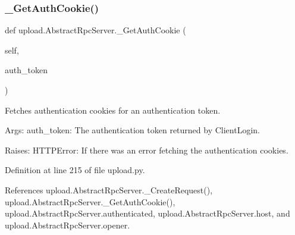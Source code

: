 \subsubsection{\texorpdfstring{\+\_\+\+Get\+Auth\+Cookie()}{\_GetAuthCookie()}\hspace{0.1cm}{\footnotesize\ttfamily [1/2]}}
{\footnotesize\ttfamily def upload.\+Abstract\+Rpc\+Server.\+\_\+\+Get\+Auth\+Cookie (\begin{DoxyParamCaption}\item[{}]{self,  }\item[{}]{auth\+\_\+token }\end{DoxyParamCaption})\hspace{0.3cm}{\ttfamily [private]}}

\begin{DoxyVerb}Fetches authentication cookies for an authentication token.

Args:
  auth_token: The authentication token returned by ClientLogin.

Raises:
  HTTPError: If there was an error fetching the authentication cookies.
\end{DoxyVerb}
 

Definition at line 215 of file upload.\+py.



References upload.\+Abstract\+Rpc\+Server.\+\_\+\+Create\+Request(), upload.\+Abstract\+Rpc\+Server.\+\_\+\+Get\+Auth\+Cookie(), upload.\+Abstract\+Rpc\+Server.\+authenticated, upload.\+Abstract\+Rpc\+Server.\+host, and upload.\+Abstract\+Rpc\+Server.\+opener.


